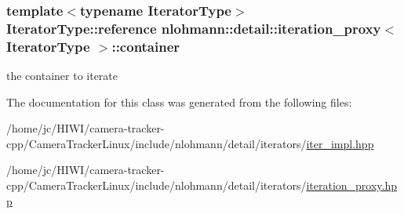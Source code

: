 \subsubsection[{\texorpdfstring{container}{container}}]{\setlength{\rightskip}{0pt plus 5cm}template$<$typename Iterator\+Type$>$ Iterator\+Type\+::reference {\bf nlohmann\+::detail\+::iteration\+\_\+proxy}$<$ Iterator\+Type $>$\+::container\hspace{0.3cm}{\ttfamily [private]}}\hypertarget{classnlohmann_1_1detail_1_1iteration__proxy_a88c0532ba4a5de1d527b18053b24fd19}{}\label{classnlohmann_1_1detail_1_1iteration__proxy_a88c0532ba4a5de1d527b18053b24fd19}


the container to iterate 



The documentation for this class was generated from the following files\+:\begin{DoxyCompactItemize}
\item 
/home/jc/\+H\+I\+W\+I/camera-\/tracker-\/cpp/\+Camera\+Tracker\+Linux/include/nlohmann/detail/iterators/\hyperlink{iter__impl_8hpp}{iter\+\_\+impl.\+hpp}\item 
/home/jc/\+H\+I\+W\+I/camera-\/tracker-\/cpp/\+Camera\+Tracker\+Linux/include/nlohmann/detail/iterators/\hyperlink{iteration__proxy_8hpp}{iteration\+\_\+proxy.\+hpp}\end{DoxyCompactItemize}

